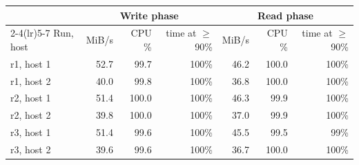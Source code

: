 \begin{tabular}{lrrrrrr}
\toprule
 & \multicolumn{3}{c}{Write phase} & \multicolumn{3}{c}{Read phase} \\
\cmidrule(lr){2-4}\cmidrule(lr){5-7}
Run, host & MiB/s & CPU \% & time at $\geq$90\% & MiB/s & CPU \% & time at $\geq$90\% \\
\midrule
r1, host 1 & 52.7 & 99.7 & 100\% & 46.2 & 100.0 & 100\% \\
r1, host 2 & 40.0 & 99.8 & 100\% & 36.8 & 100.0 & 100\% \\
r2, host 1 & 51.4 & 100.0 & 100\% & 46.3 & 99.9 & 100\% \\
r2, host 2 & 39.8 & 100.0 & 100\% & 37.0 & 99.9 & 100\% \\
r3, host 1 & 51.4 & 99.6 & 100\% & 45.5 & 99.5 & 99\% \\
r3, host 2 & 39.6 & 99.6 & 100\% & 36.7 & 100.0 & 100\% \\
\bottomrule
\end{tabular}
